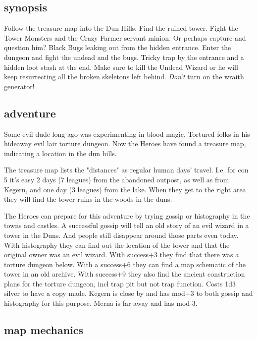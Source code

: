 \subsection*{synopsis}

Follow the treasure map into the Dun Hills. Find the ruined tower. Fight the Tower Monsters and the Crazy Farmer servant minion. Or perhaps capture and question him? Black Bugs leaking out from the hidden entrance. Enter the dungeon and fight the undead and the bugs. Tricky trap by the entrance and a hidden loot stash at the end. Make sure to kill the Undead Wizard or he will keep resurrecting all the broken skeletons left behind. \emph{Don't} turn on the wraith generator!


\subsection*{adventure}

Some evil dude long ago was experimenting in blood magic. Tortured folks in his hideaway evil lair torture dungeon. Now the Heroes have found a treasure map, indicating a location in the dun hills.


The treasure map lists the "distances" as regular human days' travel. I.e. for con 5 it's easy 2 days (7 leagues) from the abandoned outpost, as well as from Kegern, and one day (3 leagues) from the lake.
When they get to the right area they will find the tower ruins in the woods in the duns.

The Heroes can prepare for this adventure by trying gossip or histography in the towns and castles. A successful gossip will tell an old story of an evil wizard in a tower in the Duns. And people still disappear around those parts even today. With histography they can find out the location of the tower and that the original owner was an evil wizard. With success+3 they find that there was a torture dungeon below. With a success+6 they can find a map schematic of the tower in an old archive. With success+9 they also find the ancient construction plans for the torture dungeon, incl trap pit but not trap function. Costs 1d3 silver to have a copy made. Kegern is close by and has mod+3 to both gossip and histography for this purpose. Merna is far away and has mod-3.


\subsection*{map mechanics}

